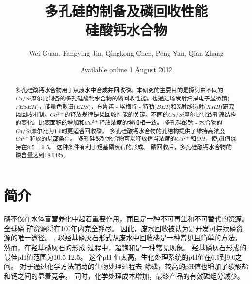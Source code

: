 \documentclass[11pt]{article}
\author{Wei Guan, Fangying Jin, Qingkong Chen, Peng Yan, Qian Zhang}
\date{Available online 1 August 2012}
\title{多孔硅的制备及磷回收性能\\\medskip
\large 硅酸钙水合物}
\begin{document}
\maketitle
\tableofcontents

\begin{abstract}

多孔硅酸钙水合物用于从废水中合成并回收磷。本研究的主要目的是探讨由不同的$Ca/Si$摩尔比制备的多孔硅酸钙水合物的磷回收性能。也通过场发射扫描电子显微镜($FESEM$)，能量色散谱($EDS$)，布鲁诺 - 埃梅特 - 特勒($BET$)和X射线衍射($XRD$)研究磷回收机制。$Ca^{2+}$的释放规律是磷回收性能的关键。不同的$Ca/Si$摩尔比导致孔隙结构的变化。比表面积的增加和$Ca^{2+}$释放浓度的增加相一致。 多孔硅酸钙 - 水合物的$Ca/Si$摩尔比为$1.6$时更适合回收磷。 多孔硅酸钙水合物的孔结构提供了维持高浓度$Ca^{2+}$释放的局部条件。 多孔硅酸钙水合物可以释放适当浓度的$Ca^{2+}$和$OH$，使pH值保持在$8.5-9.5$。 这种条件有利于羟基磷灰石的形成。 磷回收后，多孔硅酸钙水合物的磷含量达到$18.64％$。

\end{abstract}

\section{简介}
\label{sec:org9ebe8a3}
磷不仅在水体富营养化中起着重要作用，而且是一种不可再生和不可替代的资源。\cite{Suzuki_2007} 全球磷
矿资源将在100年内完全耗尽。 因此，废水回收被认为是开发可持续磷资源的唯一途径。
\cite{Efficiency_and_mechanism_of_phosphorus_removal_by_coagulation_of_iron_manganese_composited_oxide}, \cite{song07_seed_selec_cryst_calcium_phosp_phosp_recov}
以羟基磷灰石形式从废水中回收磷是一种常见且简单的方法。
\cite{chen09_phosp_remov_recov_throug_cryst,muench01_contr_struv_cryst_remov_phosp,song06_calcit_seeded_cryst_calcium_phosp_phosp_recov,song06_calcit_seeded_cryst_calcium_phosp_phosp_recov}
然而，在羟基磷灰石的形成
过程中，超饱和是一种常见现象。 羟基磷灰石形成的最佳pH值范围为10.5-12.5。\cite{liu03_influen_ph_temper_morph_hydrox} 这个pH
值太高，生化处理系统的pH值在6.0到9.0之间。\cite{hood01_bioch_hypot_explain_respon_enhan} 对于通过化学方法辅助的生物处理过程去
除磷，较高的pH值也增加了碳酸盐和钙之间的显着竞争。\cite{battistoni00_struv_cryst}
同时，化学处理成本增加，最终产品的有效磷组分减少。\cite{sengupta11_selec_remov_phosp_from_wastew}
\end{document}
